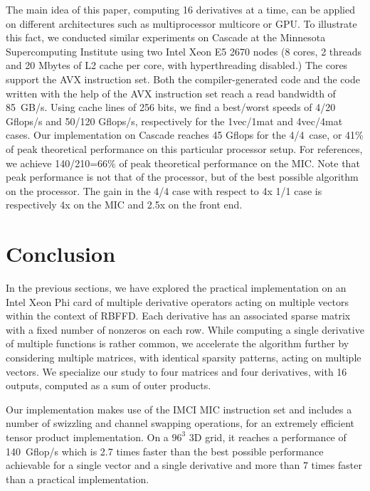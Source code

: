 \documentclass{sig-alternate}
\def\NOTE#1{{}}
\def\ger#1{#1}
\begin{document}
\ger{The main idea of this paper, computing 16 derivatives at a time,
can be applied on different architectures such as multiprocessor
multicore or GPU. To illustrate this fact, we conducted similar experiments
on Cascade at the Minnesota Supercomputing Institute
using two Intel Xeon E5 2670 nodes (8 cores, 2 threads and 20 Mbytes of L2
cache per core, with hyperthreading disabled.) The cores support the AVX instruction set. 
Both the compiler-generated code and the code written with the 
help of the AVX instruction set reach a read bandwidth of
85~GB/s. Using cache lines of 256 bits, we find a best/worst speeds of 4/20\; Gflops/s and 
50/120\; Gflops/s, respectively for the 1vec/1mat and 4vec/4mat cases. 
Our implementation on Cascade reaches 45 Gflops for the 4/4\, case, or 41\% of peak theoretical 
performance on this particular processor setup. For references, we achieve 
140/210=66\% of peak theoretical performance on the MIC. Note that peak performance 
is not that of the processor, but of the best possible algorithm on the processor. 
The gain in the 4/4 case with respect to 4x 1/1 case is respectively 4x on the MIC 
and 2.5x on the front end.  
}

\vspace{-0.5em}
\section{Conclusion}
\label{sec:ccl}

In the previous sections, we have explored the practical
implementation on an Intel Xeon Phi card of multiple derivative
operators acting on multiple vectors within the context of
RBFFD. Each derivative has an associated sparse matrix with a fixed
number of nonzeros on each row. While computing a single derivative of
multiple functions is rather common, we accelerate the algorithm further 
by considering multiple
matrices, with identical sparsity patterns, acting on multiple vectors. 
We specialize our study to four matrices and four derivatives,
with 16 outputs, computed as a sum of outer products.

Our implementation makes use of the IMCI MIC instruction set and
includes a number of swizzling and channel swapping operations, for an
extremely efficient tensor product implementation. 
\NOTE{From Evan: this is the first time $96^3$ is mentionned. Might wish to mention 
it earlier.} On a $96^3$ 3D
grid, it reaches a performance of 140~Gflop/s which is 2.7 times
faster than the best possible performance achievable for a single
vector and a single derivative and more than 7 times faster than a
practical implementation.
\end{document}
